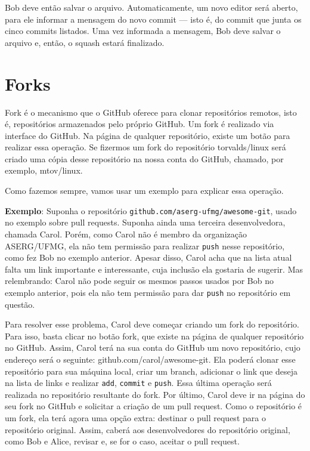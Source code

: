 \documentclass[
  11pt,
  twoside]{book}
\newcommand{\passthrough}[1]{#1}
\begin{document}
Bob deve então salvar o arquivo. Automaticamente, um novo editor será
aberto, para ele informar a mensagem do novo commit --- isto é, do
commit que junta os cinco commits listados. Uma vez informada a
mensagem, Bob deve salvar o arquivo e, então, o squash estará
finalizado.

\hypertarget{forks}{%
\section{Forks}\label{forks}}

  

Fork é o mecanismo que o GitHub oferece para clonar repositórios
remotos, isto é, repositórios armazenados pelo próprio GitHub. Um fork é
realizado via interface do GitHub. Na página de qualquer repositório,
existe um botão para realizar essa operação. Se fizermos um fork do
repositório torvalds/linux será criado uma cópia desse repositório na
nossa conta do GitHub, chamado, por exemplo, mtov/linux.

Como fazemos sempre, vamos usar um exemplo para explicar essa operação.

\textbf{Exemplo}: Suponha o repositório
\passthrough{\lstinline!github.com/aserg-ufmg/awesome-git!}, usado no
exemplo sobre pull requests. Suponha ainda uma terceira desenvolvedora,
chamada Carol. Porém, como Carol não é membro da organização ASERG/UFMG,
ela não tem permissão para realizar \passthrough{\lstinline!push!} nesse
repositório, como fez Bob no exemplo anterior. Apesar disso, Carol acha
que na lista atual falta um link importante e interessante, cuja
inclusão ela gostaria de sugerir. Mas relembrando: Carol não pode seguir
os mesmos passos usados por Bob no exemplo anterior, pois ela não tem
permissão para dar \passthrough{\lstinline!push!} no repositório em
questão.

Para resolver esse problema, Carol deve começar criando um fork do
repositório. Para isso, basta clicar no botão fork, que existe na página
de qualquer repositório no GitHub. Assim, Carol terá na sua conta do
GitHub um novo repositório, cujo endereço será o seguinte:
github.com/carol/awesome-git. Ela poderá clonar esse repositório para
sua máquina local, criar um branch, adicionar o link que deseja na lista
de links e realizar \passthrough{\lstinline!add!},
\passthrough{\lstinline!commit!} e \passthrough{\lstinline!push!}. Essa
última operação será realizada no repositório resultante do fork. Por
último, Carol deve ir na página do seu fork no GitHub e solicitar a
criação de um pull request. Como o repositório é um fork, ela terá agora
uma opção extra: destinar o pull request para o repositório original.
Assim, caberá aos desenvolvedores do repositório original, como Bob e
Alice, revisar e, se for o caso, aceitar o pull request.
\end{document}
